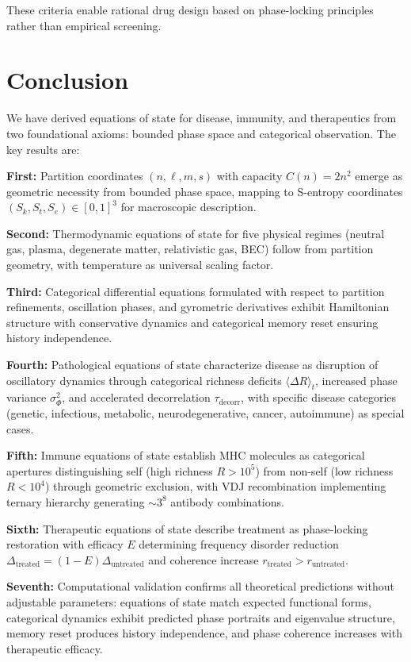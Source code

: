 \documentclass[12pt,a4paper]{article}
\theoremstyle{definition}
\theoremstyle{remark}
\newcommand{\Sk}{S_k}
\newcommand{\St}{S_t}
\newcommand{\Se}{S_e}
\newcommand{\taudecorr}{\tau_{\mathrm{decorr}}}
\begin{document}
These criteria enable rational drug design based on phase-locking principles rather than empirical screening.

\section{Conclusion}
\label{sec:conclusion}

We have derived equations of state for disease, immunity, and therapeutics from two foundational axioms: bounded phase space and categorical observation. The key results are:

\textbf{First:} Partition coordinates $(n,\ell,m,s)$ with capacity $C(n) = 2n^2$ emerge as geometric necessity from bounded phase space, mapping to S-entropy coordinates $(\Sk,\St,\Se) \in [0,1]^3$ for macroscopic description.

\textbf{Second:} Thermodynamic equations of state for five physical regimes (neutral gas, plasma, degenerate matter, relativistic gas, BEC) follow from partition geometry, with temperature as universal scaling factor.

\textbf{Third:} Categorical differential equations formulated with respect to partition refinements, oscillation phases, and gyrometric derivatives exhibit Hamiltonian structure with conservative dynamics and categorical memory reset ensuring history independence.

\textbf{Fourth:} Pathological equations of state characterize disease as disruption of oscillatory dynamics through categorical richness deficits $\langle\Delta R\rangle_t$, increased phase variance $\sigma_\Phi^2$, and accelerated decorrelation $\taudecorr$, with specific disease categories (genetic, infectious, metabolic, neurodegenerative, cancer, autoimmune) as special cases.

\textbf{Fifth:} Immune equations of state establish MHC molecules as categorical apertures distinguishing self (high richness $R > 10^5$) from non-self (low richness $R < 10^4$) through geometric exclusion, with VDJ recombination implementing ternary hierarchy generating $\sim 3^8$ antibody combinations.

\textbf{Sixth:} Therapeutic equations of state describe treatment as phase-locking restoration with efficacy $E$ determining frequency disorder reduction $\Delta_{\mathrm{treated}} = (1-E)\Delta_{\mathrm{untreated}}$ and coherence increase $r_{\mathrm{treated}} > r_{\mathrm{untreated}}$.

\textbf{Seventh:} Computational validation confirms all theoretical predictions without adjustable parameters: equations of state match expected functional forms, categorical dynamics exhibit predicted phase portraits and eigenvalue structure, memory reset produces history independence, and phase coherence increases with therapeutic efficacy.
\end{document}
